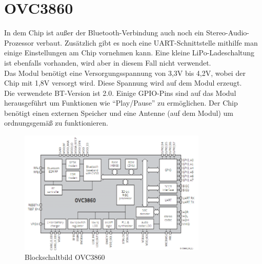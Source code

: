 \section{OVC3860}
In dem Chip ist außer der Bluetooth-Verbindung auch noch ein Stereo-Audio-Prozessor verbaut. Zusätzlich gibt es noch eine UART-Schnittstelle mithilfe man einige Einstellungen am Chip vornehmen kann. Eine kleine LiPo-Ladeschaltung ist ebenfalls vorhanden, wird aber in diesem Fall nicht verwendet.\\
Das Modul benötigt eine Versorgungsspannung von 3,3V bis 4,2V, wobei der Chip mit 1,8V versorgt wird. Diese Spannung wird auf dem Modul erzeugt.\\
Die verwendete BT-Version ist 2.0. Einige GPIO-Pins sind auf das Modul herausgeführt um Funktionen wie \enquote{Play/Pause} zu ermöglichen. Der Chip benötigt einen externen Speicher und eine Antenne (auf dem Modul) um ordnungsgemäß zu funktionieren.
\begin{figure} [h]
	\centering
	\caption{Blockschaltbild OVC3860}
	\includegraphics[width=0.8\textwidth]{img/blockschaltbild.png}
\end{figure}

